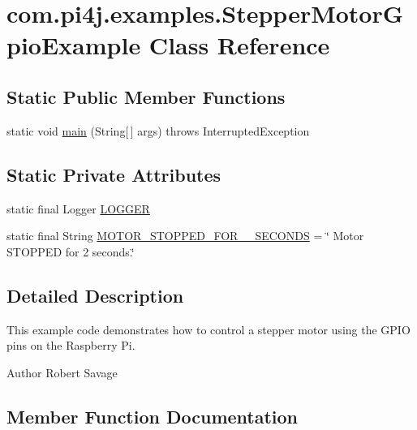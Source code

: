 \hypertarget{classcom_1_1pi4j_1_1examples_1_1StepperMotorGpioExample}{}\section{com.\+pi4j.\+examples.\+Stepper\+Motor\+Gpio\+Example Class Reference}
\label{classcom_1_1pi4j_1_1examples_1_1StepperMotorGpioExample}
\subsection*{Static Public Member Functions}
\begin{DoxyCompactItemize}
\item 
static void \hyperlink{classcom_1_1pi4j_1_1examples_1_1StepperMotorGpioExample_a72f90c649ff40d8e49266cf8ce35910c}{main} (String\mbox{[}$\,$\mbox{]} args)  throws Interrupted\+Exception 
\end{DoxyCompactItemize}
\subsection*{Static Private Attributes}
\begin{DoxyCompactItemize}
\item 
static final Logger \hyperlink{classcom_1_1pi4j_1_1examples_1_1StepperMotorGpioExample_a4ac3a0edefd332756c4120ec0c485d3a}{L\+O\+G\+G\+E\+R}
\item 
static final String \hyperlink{classcom_1_1pi4j_1_1examples_1_1StepperMotorGpioExample_acdf634e387acc55afca905a7b28468eb}{M\+O\+T\+O\+R\+\_\+\+S\+T\+O\+P\+P\+E\+D\+\_\+\+F\+O\+R\+\_\+\_\+\+S\+E\+C\+O\+N\+D\+S} = \char`\"{} Motor S\+T\+O\+P\+P\+E\+D for 2 seconds.\char`\"{}
\end{DoxyCompactItemize}


\subsection{Detailed Description}
This example code demonstrates how to control a stepper motor using the G\+P\+I\+O pins on the Raspberry Pi.

\begin{DoxyAuthor}{Author}
Robert Savage 
\end{DoxyAuthor}


\subsection{Member Function Documentation}
\hypertarget{classcom_1_1pi4j_1_1examples_1_1StepperMotorGpioExample_a72f90c649ff40d8e49266cf8ce35910c}{}
